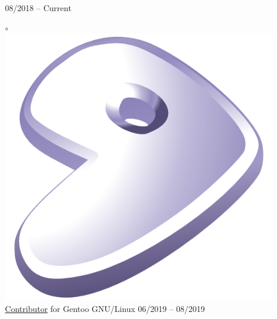 \documentclass[10pt,margin,line,pifont,palatino,courier]{res}
\begin{document}
\begin{resume}
\begin{itemize}[leftmargin=*]
\begin{itemize}[noitemsep, leftmargin=*]
            \hfill 08/2018 -- Current
        \item[$\circ$] \href{https://wiki.gentoo.org/wiki/Blas-lapack-switch}{
            \includegraphics[height=1.2\fontcharht\font`\B]{gentoo-signet.png}
            Contributor} for Gentoo GNU/Linux
            \hfill 06/2019 -- 08/2019
    \end{itemize}
\end{itemize}

%
%
%


\end{resume}
\end{document}
